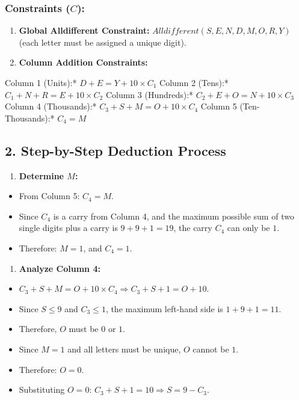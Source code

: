 \subsubsection{Constraints ($C$):}
\begin{enumerate}
  \item \textbf{Global Alldifferent Constraint:} $Alldifferent(S, E, N, D, M, O, R, Y)$ (each letter must be assigned a unique digit).
  \item \textbf{Column Addition Constraints:}
\end{enumerate}
    \textit{   }Column 1 (Units):* $D + E = Y + 10 \times C_1$
    \textit{   }Column 2 (Tens):* $C_1 + N + R = E + 10 \times C_2$
    \textit{   }Column 3 (Hundreds):* $C_2 + E + O = N + 10 \times C_3$
    \textit{   }Column 4 (Thousands):* $C_3 + S + M = O + 10 \times C_4$
    \textit{   }Column 5 (Ten-Thousands):* $C_4 = M$


\subsection{2. Step-by-Step Deduction Process}

\begin{enumerate}
  \item \textbf{Determine $M$:}
\end{enumerate}
\begin{itemize}
  \item   From Column 5: $C_4 = M$.
  \item   Since $C_4$ is a carry from Column 4, and the maximum possible sum of two single digits plus a carry is $9 + 9 + 1 = 19$, the carry $C_4$ can only be $1$.
  \item   Therefore: \textbf{$M = 1$}, and \textbf{$C_4 = 1$}.
\end{itemize}

\begin{enumerate}
  \item \textbf{Analyze Column 4:}
\end{enumerate}
\begin{itemize}
  \item   $C_3 + S + M = O + 10 \times C_4 \Rightarrow C_3 + S + 1 = O + 10$.
  \item   Since $S \le 9$ and $C_3 \le 1$, the maximum left-hand side is $1 + 9 + 1 = 11$.
  \item   Therefore, $O$ must be $0$ or $1$.
  \item   Since $M = 1$ and all letters must be unique, $O$ cannot be $1$.
  \item   Therefore: \textbf{$O = 0$}.
  \item   Substituting $O = 0$: $C_3 + S + 1 = 10 \Rightarrow S = 9 - C_3$.
\end{itemize}

